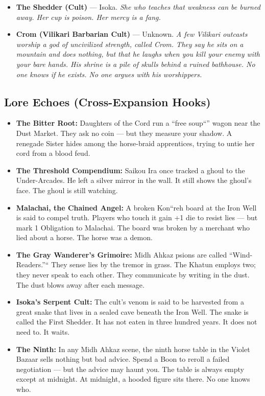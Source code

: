 {{\begin{itemize}
\begin{itemize}
    \item \textbf{The Shedder (Cult)} --- Isoka. \textit{She who teaches that weakness can be burned away. Her cup is poison. Her mercy is a fang.}
    \item \textbf{Crom (Vilikari Barbarian Cult)} --- Unknown. \textit{A few Vilikari outcasts worship a god of uncivilized strength, called Crom. They say he sits on a mountain and does nothing, but that he laughs when you kill your enemy with your bare hands. His shrine is a pile of skulls behind a ruined bathhouse. No one knows if he exists. No one argues with his worshippers.}
  \end{itemize}
\end{itemize}

\subsection*{Lore Echoes (Cross-Expansion Hooks)}
\begin{itemize}
  \item \textbf{The Bitter Root:} Daughters of the Cord run a ``free soup``'' wagon near the Dust Market. They ask no coin --- but they measure your shadow. A renegade Sister hides among the horse-braid apprentices, trying to untie her cord from a blood feud.
  \item \textbf{The Threshold Compendium:} Saikou Ira once tracked a ghoul to the Under-Arcades. He left a silver mirror in the wall. It still shows the ghoul's face. The ghoul is still watching.
  \item \textbf{Malachai, the Chained Angel:} A broken Kon``reh board at the Iron Well is said to compel truth. Players who touch it gain +1 die to resist lies --- but mark 1 Obligation to Malachai. The board was broken by a merchant who lied about a horse. The horse was a demon.
  \item \textbf{The Gray Wanderer's Grimoire:} Midh Ahkaz psions are called ``Wind-Readers.''`` They sense lies by the tremor in grass. The Khatun employs two; they never speak to each other. They communicate by writing in the dust. The dust blows away after each message.
  \item \textbf{Isoka's Serpent Cult:} The cult's venom is said to be harvested from a great snake that lives in a sealed cave beneath the Iron Well. The snake is called the First Shedder. It has not eaten in three hundred years. It does not need to. It waits.
  \item \textbf{The Ninth:} In any Midh Ahkaz scene, the ninth horse table in the Violet Bazaar sells nothing but bad advice. Spend a Boon to reroll a failed negotiation --- but the advice may haunt you. The table is always empty except at midnight. At midnight, a hooded figure sits there. No one knows who.
\end{itemize}

}}
